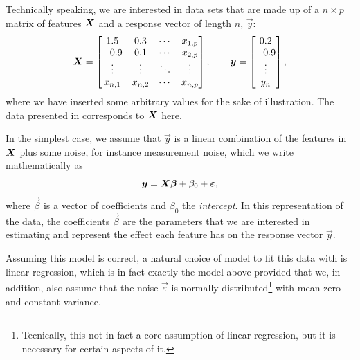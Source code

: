 Technically speaking, we are interested in data sets that are made up of a \(n \times p\) matrix of features \(\boldsymbol{X}\) and a response vector of length \(n\), \(\vec{y}\):
\[
  \boldsymbol{X} = \begin{bmatrix}
    1.5     & 0.3     & \cdots & x_{1,p} \\
    -0.9    & 0.1     & \cdots & x_{2,p} \\
    \vdots  & \vdots  & \ddots & \vdots  \\
    x_{n,1} & x_{n,2} & \cdots & x_{n,p} \\
  \end{bmatrix},\qquad
  \boldsymbol{y} = \begin{bmatrix}0.2 \\ -0.9 \\ \vdots \\ y_n\end{bmatrix},
\]
where we have inserted some arbitrary values for the sake of illustration. The data presented in  corresponds to \(\boldsymbol{X}\) here.

In the simplest case, we assume that \(\vec{y}\) is a linear combination of the features in \(\boldsymbol{X}\) plus some noise, for instance measurement noise, which we write mathematically as
\[
  \boldsymbol{y} = \boldsymbol{X}\boldsymbol{\beta} + \beta_0 + \boldsymbol{\varepsilon},
\]
where \(\vec{\beta}\) is a vector of coefficients and \(\beta_0\) the \emph{intercept}. In this representation of the data, the coefficients \(\vec{\beta}\) are the parameters that we are interested in estimating and represent the effect each feature has on the response vector \(\vec{y}\).

Assuming this model is correct, a natural choice of model to fit this data with is linear regression, which is in fact exactly the model above provided that we, in addition, also assume that the noise \(\vec{\varepsilon}\) is normally distributed\footnote{Tecnically, this not in fact a core assumption of linear regression, but it is necessary for certain aspects of it.} with mean zero and constant variance.

